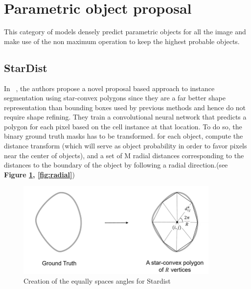 \documentclass[main.tex]{subfiles}
\begin{document}
\section{Parametric object proposal}
This category of models densely predict parametric objects for all the image and make use of the non maximum operation to keep the highest probable objects. 

\subsection{StarDist}
In ~\cite{Schmidt2018}, the authors propose a novel proposal based approach to instance segmentation using star-convex polygons since they are a far better shape representation than bounding boxes used by previous methods and hence do not require shape refining. They train a convolutional neural network that predicts a polygon for each pixel based on the cell instance at that location. To do so, the binary ground truth masks has to be transformed. for each object, compute the distance transform (which will serve as object probability in order to favor pixels near the center of objects), and a set of M radial distances corresponding to the distances to the boundary of the object by following a radial direction.(see \textbf{Figure \ref{fig:stardistangles}, \ref{fig:radial}}) 

\begin{figure}[H]
    \centering
    \includegraphics[width=10cm]{images/stardistCreateAnnot.PNG}
    \caption{Creation of the equally spaces angles for Stardist}
    \label{fig:stardistangles}
\end{figure}
\end{document}
